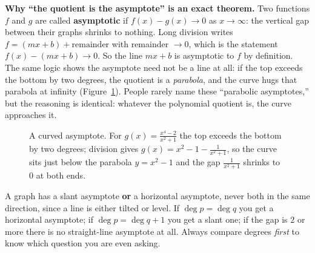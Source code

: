 \begin{whybox}
\textbf{Why ``the quotient is the asymptote'' is an exact theorem.}
Two functions $f$ and $g$ are called \textbf{asymptotic} if $f(x)-g(x)\to 0$ as
$x\to\infty$: the vertical gap between their graphs shrinks to nothing. Long division writes
$f = (mx+b) + \text{remainder}$ with remainder $\to 0$, which is the
statement $f(x)-(mx+b)\to 0$. So the line $mx+b$ is asymptotic to $f$ by
definition. The same logic shows the asymptote need not be a line at all: if the
top exceeds the bottom by two degrees, the quotient is a \emph{parabola}, and the
curve hugs that parabola at infinity (Figure~\ref{ch09:fig-parabolic}). People
rarely name these ``parabolic
asymptotes,'' but the reasoning is identical: whatever the polynomial quotient
is, the curve approaches it.
\end{whybox}

\begin{figure}[htbp]
\centering
{}
\caption{A curved asymptote. For $g(x)=\frac{x^4-2}{x^2+1}$ the top exceeds the
bottom by two degrees; division gives $g(x)=x^2-1-\frac{1}{x^2+1}$, so the curve
sits just below the parabola $y=x^2-1$ and the gap $\frac{1}{x^2+1}$ shrinks
to $0$ at both ends.}
\label{ch09:fig-parabolic}
\end{figure}

\begin{trapbox}
A graph has a slant asymptote \textbf{or} a horizontal asymptote, never both in
the same direction, since a line is either tilted or level. If $\deg p = \deg q$ you
get a horizontal asymptote; if $\deg p = \deg q + 1$ you get a slant one; if the
gap is $2$ or more there is no straight-line asymptote at all. Always compare
degrees \emph{first} to know which question you are even asking.
\end{trapbox}

